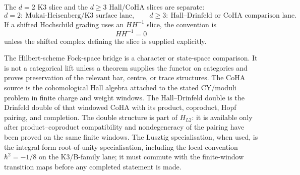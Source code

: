 \begin{theorem}
The $d=2$ K3 slice and the $d\ge3$ Hall/CoHA slices are separate:
\begin{equation}
\label{eq:gu-cy-slice-separation}
d=2:\ \text{Mukai-Heisenberg/K3 surface lane},\qquad
d\ge3:\ \text{Hall--Drinfeld or CoHA comparison lane}.
\end{equation}
If a shifted Hochschild grading uses an $HH^{-1}$ slice, the convention
is
\begin{equation}
\label{eq:gu-hh-minus-one-zero-slice}
HH^{-1}=0
\end{equation}
unless the shifted complex defining the slice is supplied explicitly.

The Hilbert-scheme Fock-space bridge is a character or state-space
comparison. It is not a categorical lift unless a theorem supplies the
functor on categories and proves preservation of the relevant bar,
centre, or trace structures. The CoHA source is the cohomological Hall
algebra attached to the stated CY/moduli problem in finite charge and
weight windows. The Hall--Drinfeld double is the Drinfeld double of
that windowed CoHA with its product, coproduct, Hopf pairing, and
completion. The double structure is part of $H_{L2}$: it is available
only after product--coproduct compatibility and nondegeneracy of the
pairing have been proved on the same finite windows. The Lusztig
specialisation, when used, is the integral-form root-of-unity
specialisation, including the local convention $\hbar^2=-1/8$ on the
K3/B-family lane; it must commute with the finite-window transition
maps before any completed statement is made.


\end{theorem}
